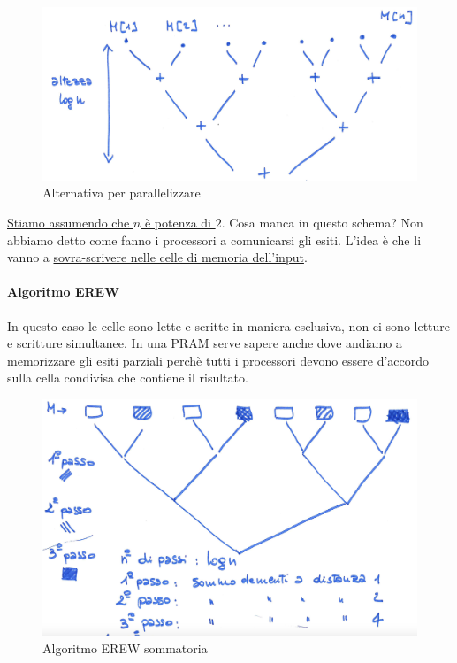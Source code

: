 \begin{figure}[h]
    \centering
    \includegraphics[scale=0.35]{images/idea2_sommatoria.png}
    \caption{Alternativa per parallelizzare}
\end{figure}

\uline{Stiamo assumendo che $n$ è potenza di $2$}. Cosa manca in questo schema? Non abbiamo detto come fanno i processori a comunicarsi gli esiti. L'idea è che li vanno a \uline{sovra-scrivere nelle celle di memoria dell'input}.

\paragraph{Algoritmo EREW}
In questo caso le celle sono lette e scritte in maniera esclusiva, non ci sono letture e scritture simultanee. In una PRAM serve sapere anche dove andiamo a memorizzare gli esiti parziali perchè tutti i processori devono essere d'accordo sulla cella condivisa che contiene il risultato.

\begin{figure}[h]
    \centering
    \includegraphics[scale=0.4]{images/erew_sommatoria.png}
    \caption{Algoritmo EREW sommatoria}
\end{figure}

